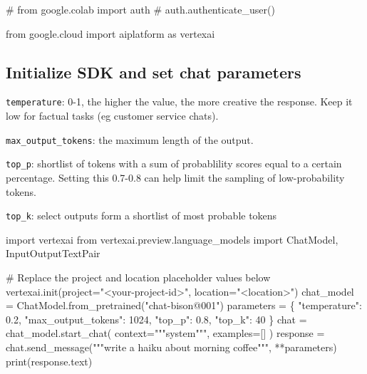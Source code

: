 \documentclass[
  letterpaper,
  DIV=11,
  numbers=noendperiod]{scrreprt}
\newenvironment{Shaded}{\begin{snugshade}}{\end{snugshade}}
\newcommand{\BuiltInTok}[1]{\textcolor[rgb]{0.00,0.23,0.31}{#1}}
\newcommand{\CommentTok}[1]{\textcolor[rgb]{0.37,0.37,0.37}{#1}}
\newcommand{\DecValTok}[1]{\textcolor[rgb]{0.68,0.00,0.00}{#1}}
\newcommand{\FloatTok}[1]{\textcolor[rgb]{0.68,0.00,0.00}{#1}}
\newcommand{\ImportTok}[1]{\textcolor[rgb]{0.00,0.46,0.62}{#1}}
\newcommand{\NormalTok}[1]{\textcolor[rgb]{0.00,0.23,0.31}{#1}}
\newcommand{\OperatorTok}[1]{\textcolor[rgb]{0.37,0.37,0.37}{#1}}
\newcommand{\StringTok}[1]{\textcolor[rgb]{0.13,0.47,0.30}{#1}}
\begin{document}
\begin{Shaded}
\begin{Highlighting}[]
\CommentTok{\# from google.colab import auth}
\CommentTok{\# auth.authenticate\_user()}
\end{Highlighting}
\end{Shaded}

\begin{Shaded}
\begin{Highlighting}[]
\ImportTok{from}\NormalTok{ google.cloud }\ImportTok{import}\NormalTok{ aiplatform }\ImportTok{as}\NormalTok{ vertexai}
\end{Highlighting}
\end{Shaded}

\hypertarget{initialize-sdk-and-set-chat-parameters}{%
\subsection{Initialize SDK and set chat
parameters}\label{initialize-sdk-and-set-chat-parameters}}

\texttt{temperature}: 0-1, the higher the value, the more creative the
response. Keep it low for factual tasks (eg customer service chats).

\texttt{max\_output\_tokens}: the maximum length of the output.

\texttt{top\_p}: shortlist of tokens with a sum of probablility scores
equal to a certain percentage. Setting this 0.7-0.8 can help limit the
sampling of low-probability tokens.

\texttt{top\_k}: select outputs form a shortlist of most probable tokens

\begin{Shaded}
\begin{Highlighting}[]
\ImportTok{import}\NormalTok{ vertexai}
\ImportTok{from}\NormalTok{ vertexai.preview.language\_models }\ImportTok{import}\NormalTok{ ChatModel, InputOutputTextPair}

\CommentTok{\# Replace the project and location placeholder values below}
\NormalTok{vertexai.init(project}\OperatorTok{=}\StringTok{"\textless{}your{-}project{-}id\textgreater{}"}\NormalTok{, location}\OperatorTok{=}\StringTok{"\textless{}location\textgreater{}"}\NormalTok{)}
\NormalTok{chat\_model }\OperatorTok{=}\NormalTok{ ChatModel.from\_pretrained(}\StringTok{"chat{-}bison@001"}\NormalTok{)}
\NormalTok{parameters }\OperatorTok{=}\NormalTok{ \{}
    \StringTok{"temperature"}\NormalTok{: }\FloatTok{0.2}\NormalTok{,}
    \StringTok{"max\_output\_tokens"}\NormalTok{: }\DecValTok{1024}\NormalTok{,}
    \StringTok{"top\_p"}\NormalTok{: }\FloatTok{0.8}\NormalTok{,}
    \StringTok{"top\_k"}\NormalTok{: }\DecValTok{40}
\NormalTok{\}}
\NormalTok{chat }\OperatorTok{=}\NormalTok{ chat\_model.start\_chat(}
\NormalTok{    context}\OperatorTok{=}\StringTok{"""system"""}\NormalTok{,}
\NormalTok{    examples}\OperatorTok{=}\NormalTok{[]}
\NormalTok{)}
\NormalTok{response }\OperatorTok{=}\NormalTok{ chat.send\_message(}\StringTok{"""write a haiku about morning coffee"""}\NormalTok{, }\OperatorTok{**}\NormalTok{parameters)}
\BuiltInTok{print}\NormalTok{(response.text)}
\end{Highlighting}
\end{Shaded}
\end{document}
